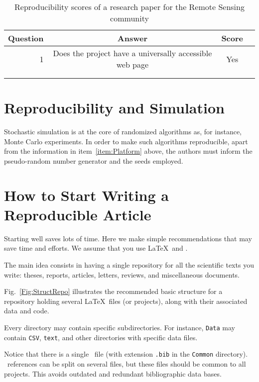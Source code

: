 \documentclass[journal]{IEEEtran}
\begin{document}
	
	\begin{table*}[hbt]
		\centering
		\caption{Reproducibility scores of a research paper for the Remote Sensing community}
		\label{tab:my_label}
		\begin{tabular}{rccc}\toprule
			Question    & Answer & Score \\ \midrule
			1           & Does the project have a universally accessible web page & Yes & \\ 
			&  \\
			& \\ \bottomrule
		\end{tabular}
	\end{table*}

\section{Reproducibility and Simulation}

Stochastic simulation is at the core of randomized algorithms as, for instance, Monte Carlo experiments.
In order to make such algorithms reproducible, apart from the information in item~\ref{item:Platform} above, the authors must inform the pseudo-random number generator and the seeds employed.

\section{How to Start Writing a Reproducible Article}

Starting well saves lots of time.
Here we make simple recommendations that may save time and efforts.
We assume that you use \LaTeX\ and \BibTeX.

The main idea consists in having a single repository for all the scientific texts you write: 
theses, 
reports, 
articles, 
letters,
reviews,
and miscellaneous documents.

Fig.~\ref{Fig:StructRepo} illustrates the recommended basic structure for a repository holding several \LaTeX\ files (or projects), along with their associated data and code.

Every directory may contain specific subdirectories.
For instance, \verb|Data| may contain \verb|CSV|, \verb|text|, and other directories with specific data files.

Notice that there is a single \BibTeX\ file (with extension \verb|.bib| in the \verb|Common| directory).
\BibTeX\ references can be split on several files, but these files should be common to all projects.
This avoids outdated and redundant bibliographic data bases.
\end{document}
